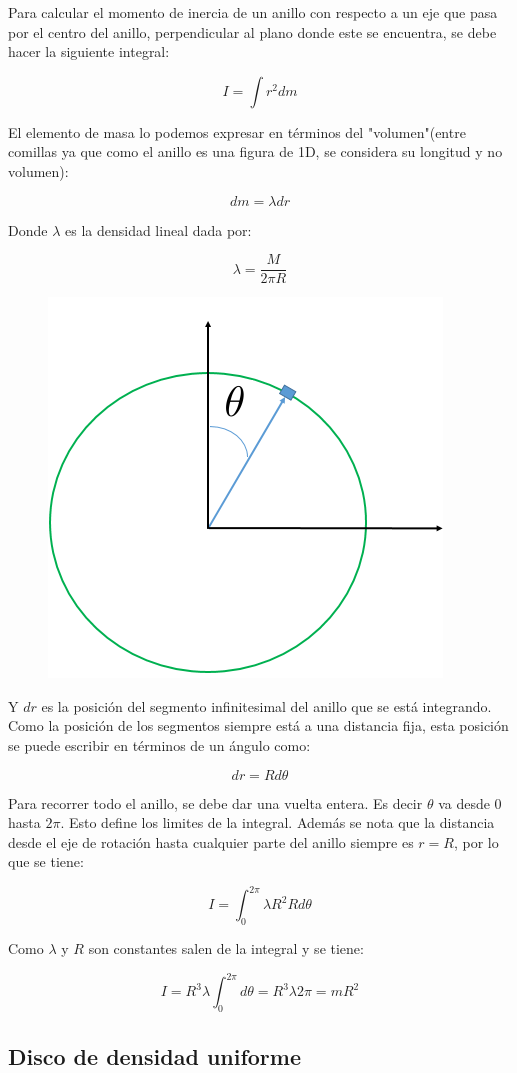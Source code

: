 \documentclass[a4paper,11pt]{article}
\theoremstyle{mytheor}
\begin{document}
Para calcular el momento de inercia de un anillo con respecto a un eje que pasa por el centro del anillo, perpendicular al plano donde este se encuentra, se debe hacer la siguiente integral:

$$ I = \int r^2 dm$$




El elemento de masa lo podemos expresar en términos del "volumen"(entre comillas ya que como el anillo es una figura de 1D, se considera su longitud y no volumen):

$$ dm = \lambda dr $$

Donde $\lambda$ es la densidad lineal dada por:

$$ \lambda = \frac{M}{2 \pi R } $$

\begin{figure}[hh]
	\includegraphics[width=0.4\linewidth]{anillo2}
	\label{fcN4}
\end{figure}

Y $dr$ es la posición del segmento infinitesimal del anillo que se está integrando. Como la posición de los segmentos siempre está a una distancia fija, esta posición se puede escribir en términos de un ángulo como:

$$ dr = R d\theta$$

Para recorrer todo el anillo, se debe dar una vuelta entera. Es decir $\theta$ va desde 0 hasta $2\pi$. Esto define los limites de la integral. Además se nota que la distancia desde el eje de rotación hasta cualquier parte del anillo siempre es $r=R$, por lo que se tiene:


$$ I = \int^{2\pi}_{0} \lambda  R^2 R d\theta$$

Como $\lambda$ y $R$ son constantes salen de la integral y se tiene:

$$ I = R^3 \lambda \int_{0}^{2\pi} d\theta = R^3 \lambda 2\pi = m R^2 $$

\subsection{Disco de densidad uniforme}
\end{document}
